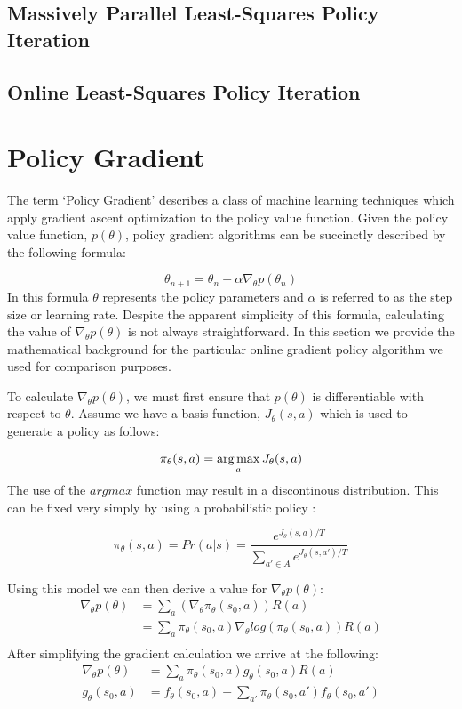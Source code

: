\subsection{Massively Parallel Least-Squares Policy Iteration}



\subsection{Online Least-Squares Policy Iteration}

\section{Policy Gradient}

The term `Policy Gradient' describes a class of machine learning techniques which apply gradient ascent optimization to the policy value function. Given the policy value function, $p(\theta)$, policy gradient algorithms can be succinctly described by the following formula:

\[
    \theta_{n+1} = \theta_{n} + \alpha\nabla_\theta p(\theta_{n})
\]
In this formula $\theta$ represents the policy parameters and $\alpha$ is referred to as the step size or learning rate. \cite{norvig}\cite{bishop} Despite the apparent simplicity of this formula, calculating the value of $\nabla_\theta p(\theta)$ is not always straightforward. In this section we provide the mathematical background for the particular online gradient policy algorithm we used for comparison purposes.

To calculate $\nabla_\theta p(\theta)$, we must first ensure that $p(\theta)$ is differentiable with respect to $\theta$. Assume we have a basis function, $J_\theta(s,a)$ which is used to generate a policy as follows:

\[
    \pi_\theta(s,a) = \operatorname*{arg\,max}_a J_\theta(s,a)
\]
The use of the $argmax$ function may result in a discontinous distribution. This can be fixed very simply by using a probabilistic policy \cite{olpomdp:lecture}:

\[
    \pi_\theta(s,a) = Pr(a|s) = \frac{e^{J_\theta(s,a)/T}}{\sum\limits_{a'\in A} e^{J_\theta(s,a')/T}}
\]

Using this model we can then derive a value for $\nabla_\theta p(\theta)$:
\[
    \begin{aligned}
        \nabla_\theta p(\theta) &= \sum_a (\nabla_\theta\pi_\theta(s_0,a))R(a) \\
        &= \sum_a \pi_\theta(s_0, a) \nabla_\theta log(\pi_\theta(s_0, a))R(a) \\
    \end{aligned}
\]
After simplifying the gradient calculation we arrive at the following:
\[
    \begin{aligned}
        \nabla_\theta p(\theta) &= \sum_a\pi_\theta(s_0,a)g_\theta(s_0,a)R(a) \\
        g_\theta(s_0,a) &= f_\theta(s_0, a) - \sum\limits_{a'} \pi_\theta(s_0,a')f_\theta(s_0,a')
    \end{aligned}
\]

